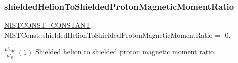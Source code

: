 \subsubsection{\texorpdfstring{shielded\+Helion\+To\+Shielded\+Proton\+Magnetic\+Moment\+Ratio}{shieldedHelionToShieldedProtonMagneticMomentRatio}}
{\footnotesize\ttfamily \mbox{\hyperlink{group___n_i_s_t_const-_macros_ga2b0fc1d7452373f816175dd86ce26729}{N\+I\+S\+T\+C\+O\+N\+S\+T\+\_\+\+C\+O\+N\+S\+T\+A\+NT}} N\+I\+S\+T\+Const\+::shielded\+Helion\+To\+Shielded\+Proton\+Magnetic\+Moment\+Ratio = -\/0.}

$\frac{\mu'_{^3\textrm{He}}}{\mu'_p} \ (1)$ Shielded helion to shielded proton magnetic moment ratio. 